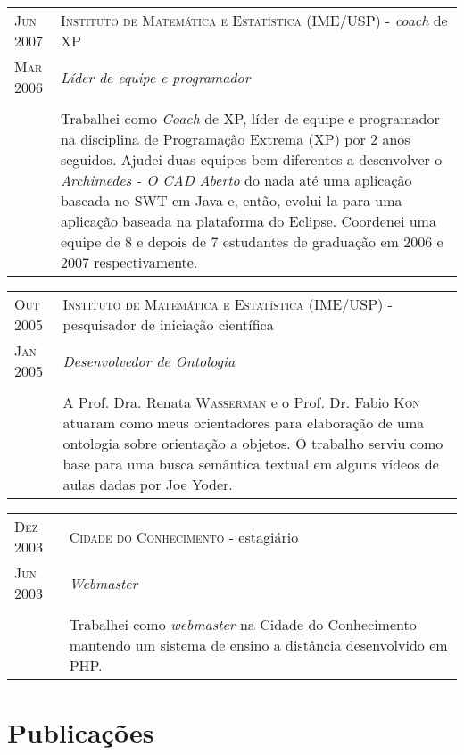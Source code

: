 \documentclass[letter,10pt]{article}
\begin{document}
\begin{tabular}{p{2.5cm}|p{13.5cm}}
  \textsc{Jun 2007} & \textsc{Instituto de Matemática e Estatística
    (IME/USP)} - \textit{coach} de XP\\
  \textsc{Mar 2006}& \emph{Líder de equipe e programador}\\
  &\\
  &  Trabalhei como \textit{Coach} de XP, líder de equipe e
  programador na disciplina de Programação Extrema (XP) por 2 anos
  seguidos. Ajudei duas equipes bem diferentes a desenvolver o
  \emph{Archimedes - O CAD Aberto}  do nada até uma aplicação baseada
  no SWT em Java e, então, evolui-la para uma aplicação baseada na
  plataforma do Eclipse. Coordenei uma equipe de 8 e depois de 7
  estudantes de graduação em 2006 e 2007 respectivamente.
\end{tabular}

\begin{tabular}{p{2.5cm}|p{13.5cm}}
  \textsc{Out 2005} & \textsc{Instituto de Matemática e Estatística
    (IME/USP)} - pesquisador de iniciação científica\\
  \textsc{Jan 2005}& \emph{Desenvolvedor de Ontologia}\\
  &\\
  & A Prof. Dra. Renata \textsc{Wasserman} e o Prof. Dr. Fabio
  \textsc{Kon} atuaram como meus orientadores para elaboração de uma
  ontologia sobre orientação a objetos. O trabalho serviu como base
  para uma busca semântica textual em alguns vídeos de aulas dadas por
  Joe Yoder.
\end{tabular}

\begin{tabular}{p{2.5cm}|p{13.5cm}}
  \textsc{Dez 2003} & \textsc{Cidade do Conhecimento} - estagiário\\
  \textsc{Jun 2003}& \emph{Webmaster}\\
  &\\
  & Trabalhei como \textit{webmaster} na Cidade do Conhecimento
  mantendo um sistema de ensino a distância desenvolvido em PHP.
\end{tabular}

\section{Publicações}
\end{document}
